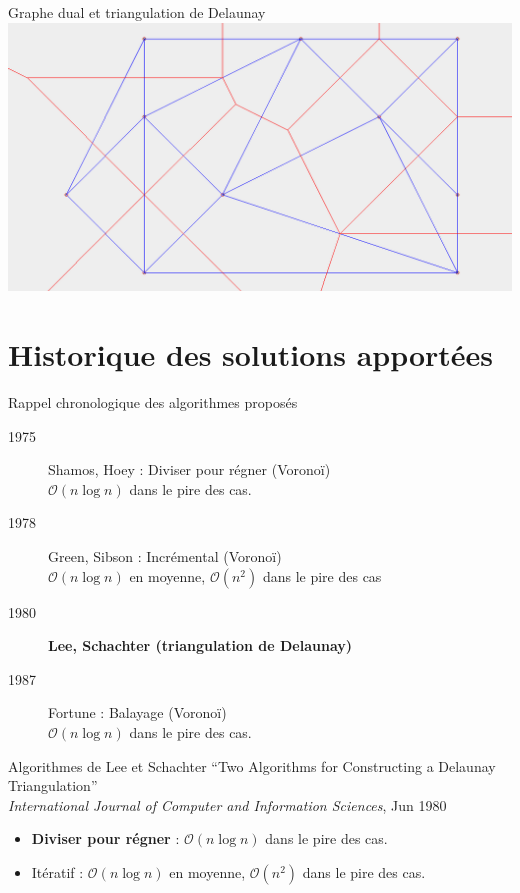 \documentclass{beamer}
\begin{document}
\begin{frame}
  \begin{block}{Graphe dual et triangulation de Delaunay}
    \includegraphics[width=\textwidth]{dual.png}
  \end{block}
\end{frame}

\section{Historique des solutions apportées}

\begin{frame}
  \begin{block}{Rappel chronologique des algorithmes proposés}
    \begin{description}
      \item[1975] Shamos, Hoey : Diviser pour régner (Voronoï)\\
        $\mathcal O(n \log n)$ dans le pire des cas.
      \item[1978] Green, Sibson : Incrémental (Voronoï)\\
        $\mathcal O(n \log n)$ en moyenne, $\mathcal O(n^2)$ dans le pire des cas
      \item[1980] \textbf{Lee, Schachter (triangulation de Delaunay)}
      \item[1987] Fortune : Balayage (Voronoï)\\
        $\mathcal O(n \log n)$ dans le pire des cas.
    \end{description}
  \end{block}
\end{frame}

\begin{frame}
  \begin{block}{Algorithmes de Lee et Schachter}
    ``Two Algorithms for Constructing a Delaunay Triangulation''\\
    \small{\textit{International Journal of Computer and Information Sciences}, Jun 1980}
    \begin{itemize}
      \item \textbf{Diviser pour régner} : $\mathcal O(n \log n)$ dans le pire des cas.
      \item Itératif : $\mathcal O(n \log n)$ en moyenne, $\mathcal O(n^2)$ dans le pire des cas.
    \end{itemize}
  \end{block}
\end{frame}
\end{document}
